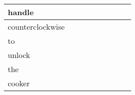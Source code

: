 \documentclass[landscape]{article}
\newcommand{\ssp}{\hspace{2pt}}
\begin{document}
\begin{tabular}{|l|p{10pt}|p{10pt}|p{10pt}|p{10pt}|p{10pt}|p{10pt}|p{10pt}|p{10pt}|}
\hline
\ssp handle \ssp&\hspace{2pt}&\hspace{2pt}&\hspace{2pt}&\hspace{2pt}&\hspace{2pt}&\hspace{2pt}&\hspace{2pt}&\hspace{2pt}\\
\hline
\ssp counterclockwise \ssp&\hspace{2pt}&\hspace{2pt}&\hspace{2pt}&\hspace{2pt}&\hspace{2pt}&\hspace{2pt}&\hspace{2pt}&\hspace{2pt}\\
\hline
\ssp to \ssp&\hspace{2pt}&\hspace{2pt}&\hspace{2pt}&\hspace{2pt}&\hspace{2pt}&\hspace{2pt}&\hspace{2pt}&\hspace{2pt}\\
\hline
\ssp unlock \ssp&\hspace{2pt}&\hspace{2pt}&\hspace{2pt}&\hspace{2pt}&\hspace{2pt}&\hspace{2pt}&\hspace{2pt}&\hspace{2pt}\\
\hline
\ssp the \ssp&\hspace{2pt}&\hspace{2pt}&\hspace{2pt}&\hspace{2pt}&\hspace{2pt}&\hspace{2pt}&\hspace{2pt}&\hspace{2pt}\\
\hline
\ssp cooker \ssp&\hspace{2pt}&\hspace{2pt}&\hspace{2pt}&\hspace{2pt}&\hspace{2pt}&\hspace{2pt}&\hspace{2pt}&\hspace{2pt}\\

\end{tabular}
\end{document}
